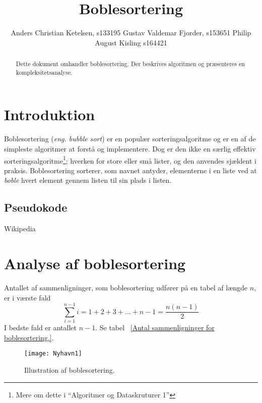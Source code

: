 \documentclass[12pt,a4paper]{article}
\author{Anders Christian Ketelsen, s133195 Gustav Valdemar Fjorder, s153651 Philip August Kisling s164421}
\title{Boblesortering}
\begin{document}
\maketitle
\begin{abstract}
Dette dokument omhandler boblesortering. Der beskrives algoritmen og præsenteres en kompleksitetsanalyse.
\end{abstract}
\section{Introduktion}

Boblesortering (\textsl{eng. bubble sort}) er en populær sorteringsalgoritme og er en af de simpleste algoritmer at forstå og implementere. Dog er den ikke en særlig effektiv sorteringsalgoritme\footnote{Mere om dette i ``Algoritmer og Dataskruturer 1''}; hverken for store eller små lister, og den anvendes sjældent i praksis. Boblesortering sorterer, som navnet antyder, elementerne i en liste ved at \textsl{boble} hvert element gennem listen til sin plads i listen.


\subsection{Pseudokode}
Wikipedia 



\section{Analyse af boblesortering}
Antallet af sammenligninger, som boblesortering udfører på en tabel af længde $n$, er i værste fald
\[\sum_{i=1}^{n-1}i=1+2+3+...+n-1=\frac{n(n-1)}{2}\]
I bedste fald er antallet $n-1$. Se tabel ~\ref{Antal sammenligninger for boblesortering.}.

\begin{figure}
\centering
\texttt{[image: Nyhavn1]}\caption{Illustration af boblesortering.}\label{fig:nyhavn}
\end{figure}
\end{document}
